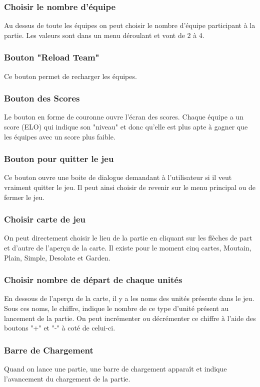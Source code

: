 \documentclass{report}
\begin{document}
\subsubsection{Choisir le nombre d'équipe}
Au dessus de toute les équipes on peut choisir le nombre d'équipe participant à la partie. Les valeurs sont dans un menu déroulant et vont de 2 à 4.
\subsubsection{Bouton "Reload Team"}
Ce bouton permet de recharger les équipes.
\subsubsection{Bouton des Scores}
Le bouton en forme de couronne ouvre l'écran des scores. Chaque équipe a un score (ELO) qui indique son "niveau" et donc qu'elle est plus apte à gagner que les équipes avec un score plus faible.
\subsubsection{Bouton pour quitter le jeu}
Ce bouton ouvre une boite de dialogue demandant à l'utilisateur si il veut vraiment quitter le jeu. Il peut ainsi choisir de revenir sur le menu principal ou de fermer le jeu.
\subsubsection{Choisir carte de jeu}
On peut directement choisir le lieu de la partie en cliquant sur les flèches de part et d'autre de l’aperçu de la carte. Il existe pour le moment cinq cartes, Moutain, Plain, Simple, Desolate et Garden.
\subsubsection{Choisir nombre de départ de chaque unités}
En dessous de l’aperçu de la carte, il y a les noms des unités présente dans le jeu. Sous ces noms, le chiffre, indique le nombre de ce type d'unité présent au lancement de la partie. On peut incrémenter ou décrémenter ce chiffre à l'aide des boutons "+" et "-" à coté de celui-ci.
\subsubsection{Barre de Chargement}
Quand on lance une partie, une barre de chargement apparaît et indique l'avancement du chargement de la partie.
\end{document}
